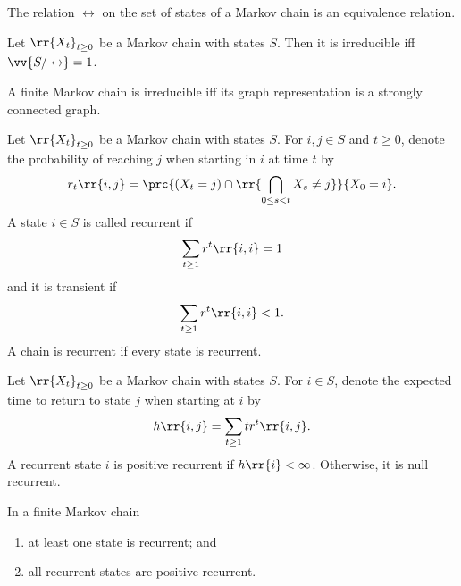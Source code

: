 \documentclass{article}
\begin{document}
\begin{lemma}
  The relation $\leftrightarrow$ on the set of states of a Markov chain is an equivalence
  relation.
\end{lemma}

\begin{definition}[Irreducible]
  Let $\rr{X_t}_{t\geq 0}$ be a Markov chain with states $S$. Then it is
  irreducible iff $\vv{S/\leftrightarrow}=1$.
\end{definition}

\begin{lemma}
  A finite Markov chain is irreducible iff its graph representation is a strongly
  connected graph.
\end{lemma}

\begin{definition}
  Let $\rr{X_t}_{t\geq 0}$ be a Markov chain with states $S$. For $i,j\in S$ and $t\geq 0$,
  denote the probability of reaching $j$ when starting in $i$ at time $t$ by
  \begin{align*}
    r_t\rr{i,j}=\prc{(X_t = j)\cap\rr{\bigcap_{0\leq s<t} X_s \neq j}}{X_0 = i}.
  \end{align*}
  A state $i\in S$ is called recurrent if
  \begin{align*}
    \sum_{t\geq 1} r^t\rr{i,i} = 1
  \end{align*}
  and it is transient if
  \begin{align*}
    \sum_{t\geq 1} r^t\rr{i,i} < 1.
  \end{align*}
  A chain is recurrent if every state is recurrent.
\end{definition}

\begin{definition}
  Let $\rr{X_t}_{t\geq 0}$ be a Markov chain with states $S$. For $i\in S$, denote
  the expected time to return to state $j$ when starting at $i$ by
  \begin{align*}
    h\rr{i,j}=\sum_{t\geq 1} tr^t\rr{i,j}.
  \end{align*}
  A recurrent state $i$ is positive recurrent if $h\rr{i}<\infty$. Otherwise, it is
  null recurrent.
\end{definition}

\begin{lemma}
  In a finite Markov chain
  \begin{enumerate}
    \item at least one state is recurrent; and
    \item all recurrent states are positive recurrent.
  \end{enumerate}
\end{lemma}
\end{document}
